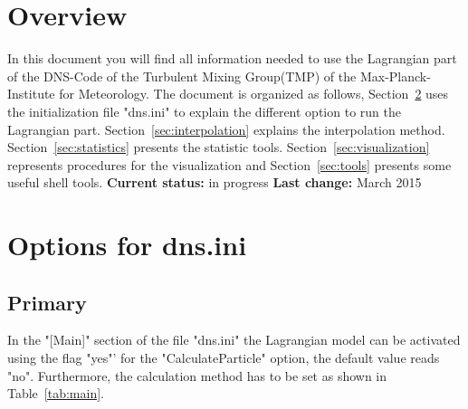 \documentclass[12pt]{article}
\begin{document}
\maketitle

\section{Overview}
In this document you will find all information needed to use the Lagrangian part of the DNS-Code of the Turbulent Mixing Group(TMP) of the Max-Planck-Institute for Meteorology. The document is organized as follows, Section~\ref{sec:options} uses the initialization file "dns.ini" to explain the different option to run the Lagrangian part. Section~\ref{sec:interpolation} explains the interpolation method. Section~\ref{sec:statistics} presents the statistic tools. Section~\ref{sec:visualization} represents procedures for the visualization and Section~\ref{sec:tools} presents some useful shell tools.\newline
\textbf{Current status:} in progress \newline
\textbf{Last change:} March 2015
\newpage
\section{Options for dns.ini}
\label{sec:options}
\subsection{Primary}
In the "[Main]" section of the file "dns.ini" the Lagrangian model can be activated using the flag "yes"' for the "CalculateParticle" option, the default value reads "no". Furthermore, the calculation method has to be set as shown in Table~\ref{tab:main}. 
\begin{table}
    \caption{Options which can be set in [Main] of "dns.ini".}
    \label{tab:main}
\end{table}
\end{document}
